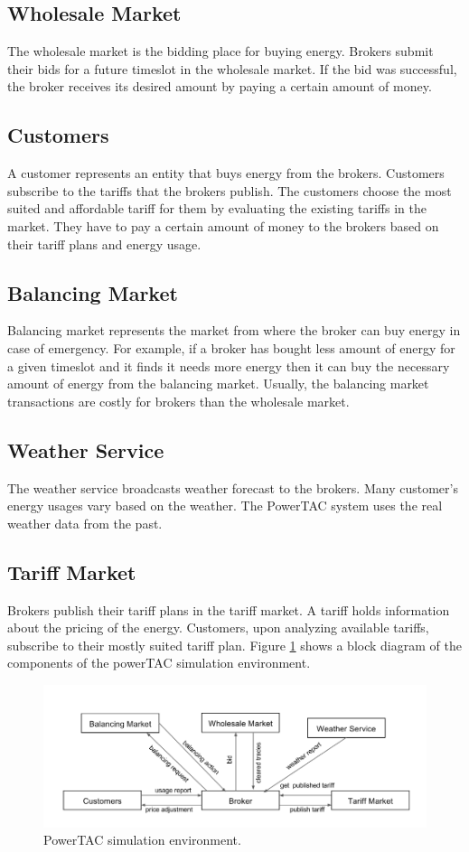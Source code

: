 \subsection{Wholesale Market}
The wholesale market is the bidding place for buying energy. Brokers submit their bids for a future timeslot in the wholesale market. If the bid was successful, the broker receives its desired amount by paying a certain amount of money. 

\subsection{Customers}
A customer represents an entity that buys energy from the brokers. Customers subscribe to the tariffs that the brokers publish. The customers choose the most suited and affordable tariff for them by evaluating the existing tariffs in the market. They have to pay a certain amount of money to the brokers based on their tariff plans and energy usage.

\subsection{Balancing Market}
Balancing market represents the market from where the broker can buy energy in case of emergency. For example, if a broker has bought less amount of energy for a given timeslot and it finds it needs more energy then it can buy the necessary amount of energy from the balancing market. Usually, the balancing market transactions are costly for brokers than the wholesale market.

\subsection{Weather Service}
The weather service broadcasts weather forecast to the brokers. Many customer's energy usages vary based on the weather. The PowerTAC system uses the real weather data from the past.

\subsection{Tariff Market}
Brokers publish their tariff plans in the tariff market. A tariff holds information about the pricing of the energy. Customers, upon analyzing available tariffs, subscribe to their mostly suited tariff plan. Figure \ref{fig:simulation-environment}  shows a block diagram of the components of the powerTAC simulation environment.

\begin{figure}[h!]
  \includegraphics[width=\linewidth]{simulation-environment.png}
  \caption{PowerTAC simulation environment.}
  \label{fig:simulation-environment}
\end{figure}

